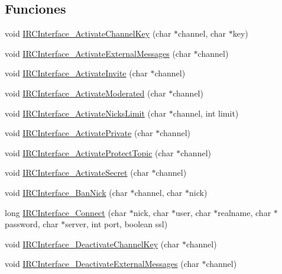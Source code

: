 \subsection*{Funciones}
\begin{DoxyCompactItemize}
\item 
void \hyperlink{G-2313-06-P2__client_8c_a33f80a29a744e4182b29e23f13c1f05c}{I\+R\+C\+Interface\+\_\+\+Activate\+Channel\+Key} (char $\ast$channel, char $\ast$key)
\item 
void \hyperlink{G-2313-06-P2__client_8c_a7a439929c246e342ae525139b2c39f5d}{I\+R\+C\+Interface\+\_\+\+Activate\+External\+Messages} (char $\ast$channel)
\item 
void \hyperlink{G-2313-06-P2__client_8c_ac72762ab1e3575b421b967241db23f9c}{I\+R\+C\+Interface\+\_\+\+Activate\+Invite} (char $\ast$channel)
\item 
void \hyperlink{G-2313-06-P2__client_8c_af83498f4058311f4562c43a9b70566b2}{I\+R\+C\+Interface\+\_\+\+Activate\+Moderated} (char $\ast$channel)
\item 
void \hyperlink{G-2313-06-P2__client_8c_ab5694cc413472173bfcaa969c7d9800e}{I\+R\+C\+Interface\+\_\+\+Activate\+Nicks\+Limit} (char $\ast$channel, int limit)
\item 
void \hyperlink{G-2313-06-P2__client_8c_ab1f09c737c7c109a97e22de6072d731d}{I\+R\+C\+Interface\+\_\+\+Activate\+Private} (char $\ast$channel)
\item 
void \hyperlink{G-2313-06-P2__client_8c_ac45f12d4dcacf3b5485eec6fdc51df93}{I\+R\+C\+Interface\+\_\+\+Activate\+Protect\+Topic} (char $\ast$channel)
\item 
void \hyperlink{G-2313-06-P2__client_8c_aa9e9155115b834d85a4d10cb27f99093}{I\+R\+C\+Interface\+\_\+\+Activate\+Secret} (char $\ast$channel)
\item 
void \hyperlink{G-2313-06-P2__client_8c_a42773b5a840f9d0455f148d285e1e595}{I\+R\+C\+Interface\+\_\+\+Ban\+Nick} (char $\ast$channel, char $\ast$nick)
\item 
long \hyperlink{G-2313-06-P2__client_8c_aed072f4ce0d6e90697d4d6eb0278a2ad}{I\+R\+C\+Interface\+\_\+\+Connect} (char $\ast$nick, char $\ast$user, char $\ast$realname, char $\ast$password, char $\ast$server, int port, boolean ssl)
\item 
void \hyperlink{G-2313-06-P2__client_8c_a3e67ee0cd384b524d57fda14593dce8e}{I\+R\+C\+Interface\+\_\+\+Deactivate\+Channel\+Key} (char $\ast$channel)
\item 
void \hyperlink{G-2313-06-P2__client_8c_a638b1535f4ecbc9a6affb2df2a6a946e}{I\+R\+C\+Interface\+\_\+\+Deactivate\+External\+Messages} (char $\ast$channel)

\end{DoxyCompactItemize}
